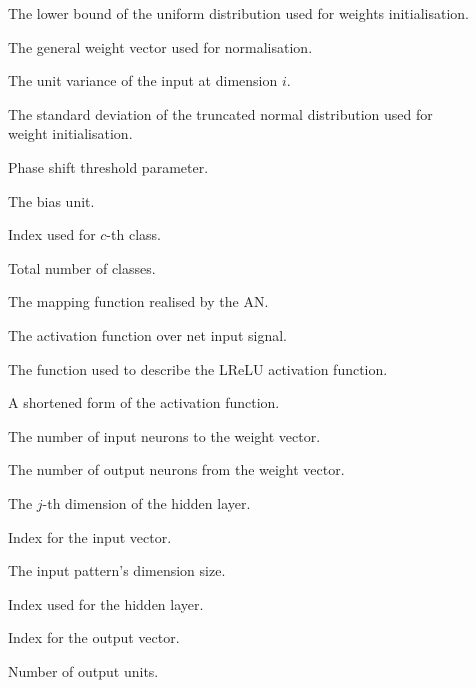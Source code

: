 \begin{description}
	\item [\parbox{2cm}{$\omega_{min}$}] \parbox{12.5cm}{The lower bound of the uniform distribution used for weights initialisation.}
	\item [\parbox{2cm}{$\omega$}] \parbox{12.5cm}{The general weight vector used for normalisation.}
	\item [\parbox{2cm}{$\sigma^2_i$}] \parbox{12.5cm}{The unit variance of the input at dimension $i$.}
	\item [\parbox{2cm}{$\sigma$}] \parbox{12.5cm}{The standard deviation of the truncated normal distribution used for weight initialisation.}
	\item [\parbox{2cm}{$\tau$}] \parbox{12.5cm}{Phase shift threshold parameter.}
	\item [\parbox{2cm}{$\theta$}] \parbox{12.5cm}{The bias unit.}
	\item [\parbox{2cm}{$c$}] \parbox{12.5cm}{Index used for $c$-th class.}
	\item [\parbox{2cm}{$C$}] \parbox{12.5cm}{Total number of classes.}
	\item [\parbox{2cm}{$f_{AN}$}] \parbox{12.5cm}{The mapping function realised by the \acs{AN}.}
	\item [\parbox{2cm}{$f(net)$}] \parbox{12.5cm}{The activation function over net input signal.}
	\item [\parbox{2cm}{$f(x)$}] \parbox{12.5cm}{The function used to describe the \acs{LReLU} activation function.}
	\item [\parbox{2cm}{$f$}] \parbox{12.5cm}{A shortened form of the activation function.}
	\item [\parbox{2cm}{$fanin$}] \parbox{12.5cm}{The number of input neurons to the weight vector.}
	\item [\parbox{2cm}{$fanout$}] \parbox{12.5cm}{The number of output neurons from the weight vector.}
	\item [\parbox{2cm}{$h_{j}$}] \parbox{12.5cm}{The $j$-th dimension of the hidden layer.}
	\item [\parbox{2cm}{$i$}] \parbox{12.5cm}{Index for the input vector.}
	\item [\parbox{2cm}{$I$}] \parbox{12.5cm}{The input pattern's dimension size.}
	\item [\parbox{2cm}{$j$}] \parbox{12.5cm}{Index used for the hidden layer.}
	\item [\parbox{2cm}{$k$}] \parbox{12.5cm}{Index for the output vector.}
	\item [\parbox{2cm}{$K$}] \parbox{12.5cm}{Number of output units.}

\end{description}
